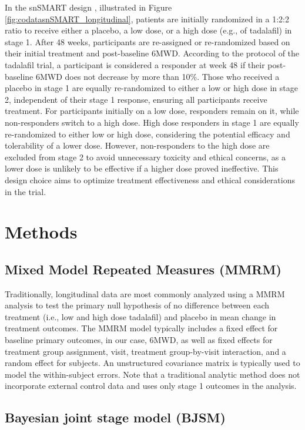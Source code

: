 In the \ac{snSMART} design \citep{wang2023dynamic}, illustrated in Figure \ref{fig:codatasnSMART_longitudinal}, patients are initially randomized in a 1:2:2 ratio to receive either a placebo, a low dose, or a high dose (e.g., of tadalafil) in stage 1. After 48 weeks, participants are re-assigned or re-randomized based on their initial treatment and post-baseline 6MWD. According to the protocol of the tadalafil trial, a participant is considered a responder at week 48 if their post-baseline \ac{6MWD} does not decrease by more than 10\%. Those who received a placebo in stage 1 are equally re-randomized to either a low or high dose in stage 2, independent of their stage 1 response, ensuring all participants receive treatment. For participants initially on a low dose, responders remain on it, while non-responders switch to a high dose. High dose responders in stage 1 are equally re-randomized to either low or high dose, considering the potential efficacy and tolerability of a lower dose. However, non-responders to the high dose are excluded from stage 2 to avoid unnecessary toxicity and ethical concerns, as a lower dose is unlikely to be effective if a higher dose proved ineffective. This design choice aims to optimize treatment effectiveness and ethical considerations in the trial.

\section{Methods}
\label{sec:methods}

\subsection{Mixed Model Repeated Measures (MMRM)}
Traditionally, longitudinal data are most commonly analyzed using a \ac{MMRM} analysis to test the primary null hypothesis of no difference between each treatment (i.e., low and high dose tadalafil) and placebo in mean change in treatment outcomes. The \ac{MMRM} model typically includes a fixed effect for baseline primary outcomes, in our case, 6MWD, as well as fixed effects for treatment group assignment, visit, treatment group-by-visit interaction, and a random effect for subjects. An unstructured covariance matrix is typically used to model the within-subject errors. Note that a traditional analytic method does not incorporate external control data and uses only stage 1 outcomes in the analysis.

\subsection{Bayesian joint stage model (BJSM)}

